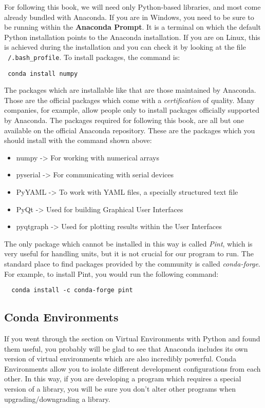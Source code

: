 For following this book, we will need only Python-based libraries, and most come already bundled with Anaconda. If you are in Windows, you need to be sure to be running within the \textbf{Anaconda Prompt}. It is a terminal on which the default Python installation points to the Anaconda installation. If you are on Linux, this is achieved during the installation and you can check it by looking at the file \texttt{~/.bash_profile}. To install packages, the command is:
\begin{verbatim}
 conda install numpy
\end{verbatim}

The packages which are installable like that are those maintained by Anaconda. Those are the official packages which come with a \emph{certification} of quality. Many companies, for example, allow people only to install packages officially supported by Anaconda. The packages required for following this book, are all but one available on the official Anaconda repository. These are the packages which you should install with the command shown above: 

\begin{itemize}
 \item numpy -> For working with numerical arrays
 \item pyserial -> For communicating with serial devices
 \item PyYAML -> To work with YAML files, a specially structured text file
 \item PyQt -> Used for building Graphical User Interfaces
 \item pyqtgraph -> Used for plotting results within the User Interfaces
\end{itemize}

The only package which cannot be installed in this way is called \emph{Pint}, which is very useful for handling units, but it is not crucial for our program to run. The standard place to find packages provided by the community is called \emph{conda-forge}. For example, to install Pint, you would run the following command:

\begin{verbatim}
  conda install -c conda-forge pint
\end{verbatim}

\subsection{Conda Environments}
If you went through the section on Virtual Environments with Python and found them useful, you probably will be glad to see that Anaconda includes its own version of virtual environments which are also incredibly powerful. Conda Environments allow you to isolate different development configurations from each other. In this way, if you are developing a program which requires a special version of a library, you will be sure you don't alter other programs when upgrading/downgrading a library. 

